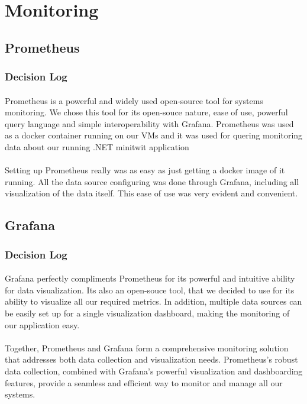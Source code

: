 \section{Monitoring}
\subsection{Prometheus}

\subsubsection{Decision Log}
\paragraph{} Prometheus is a powerful and widely used open-source tool for systems monitoring. We chose this tool for its open-souce nature, ease of use, powerful query language and simple interoperability with Grafana. Prometheus was used as a docker container running on our VMs and it was used for quering monitoring data about our running .NET minitwit application
\paragraph{} Setting up Prometheus really was as easy as just getting a docker image of it running. All the data source configuring was done through Grafana, including all visualization of the data itself. This ease of use was very evident and convenient.

\subsection{Grafana}
\subsubsection{Decision Log}
\paragraph{} Grafana perfectly compliments Prometheus for its powerful and intuitive ability for data visualization. Its also an open-souce tool, that we decided to use for its ability to visualize all our required metrics. In addition, multiple data sources can be easily set up for a single visualization dashboard, making the monitoring of our application easy.

\paragraph{} Together, Prometheus and Grafana form a comprehensive monitoring solution that addresses both data collection and visualization needs. Prometheus's robust data collection, combined with Grafana's powerful visualization and dashboarding features, provide a seamless and efficient way to monitor and manage all our systems.

